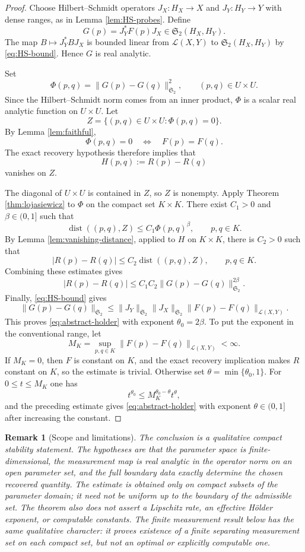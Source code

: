 \documentclass[12pt,oneside]{amsart}
\newtheorem{remark}[theorem]{Remark}
\newcommand{\cL}{\mathcal L}
\newcommand{\dist}{\operatorname{dist}}
\newcommand{\HS}{\mathfrak S_2}
\begin{document}
\begin{proof}
Choose Hilbert--Schmidt operators $J_X:H_X\to X$ and $J_Y:H_Y\to Y$ with dense ranges, as in Lemma \ref{lem:HS-probes}.  Define
\[
        G(p)=J_Y^*F(p)J_X\in\HS(H_X,H_Y).
\]
The map $B\mapsto J_Y^*BJ_X$ is bounded linear from $\cL(X,Y)$ to $\HS(H_X,H_Y)$ by \eqref{eq:HS-bound}.  Hence $G$ is real analytic.

Set
\[
        \Phi(p,q)=\|G(p)-G(q)\|_{\HS}^2,
        \qquad (p,q)\in U\times U .
\]
Since the Hilbert--Schmidt norm comes from an inner product, $\Phi$ is a scalar real analytic function on $U\times U$.  Let
\[
        Z=\{(p,q)\in U\times U:\Phi(p,q)=0\}.
\]
By Lemma \ref{lem:faithful},
\[
        \Phi(p,q)=0
        \quad\Longleftrightarrow\quad
        F(p)=F(q).
\]
The exact recovery hypothesis therefore implies that
\[
        H(p,q):=R(p)-R(q)
\]
vanishes on $Z$.

The diagonal of $U\times U$ is contained in $Z$, so $Z$ is nonempty.  Apply Theorem \ref{thm:lojasiewicz} to $\Phi$ on the compact set $K\times K$.  There exist $C_1>0$ and $\beta\in(0,1]$ such that
\[
        \dist((p,q),Z)
        \le C_1\Phi(p,q)^\beta,
        \qquad p,q\in K .
\]
By Lemma \ref{lem:vanishing-distance}, applied to $H$ on $K\times K$, there is $C_2>0$ such that
\[
        |R(p)-R(q)|
        \le C_2\dist((p,q),Z),
        \qquad p,q\in K .
\]
Combining these estimates gives
\[
        |R(p)-R(q)|
        \le C_1C_2\|G(p)-G(q)\|_{\HS}^{2\beta}.
\]
Finally, \eqref{eq:HS-bound} gives
\[
        \|G(p)-G(q)\|_{\HS}
        \le \|J_Y\|_{\HS}\|J_X\|_{\HS}
        \|F(p)-F(q)\|_{\cL(X,Y)} .
\]
This proves \eqref{eq:abstract-holder} with exponent $\theta_0=2\beta$.  To put the exponent in the conventional range, let
\[
        M_K=\sup_{p,q\in K}\|F(p)-F(q)\|_{\cL(X,Y)}<\infty .
\]
If $M_K=0$, then $F$ is constant on $K$, and the exact recovery implication makes $R$ constant on $K$, so the estimate is trivial.  Otherwise set $\theta=\min\{\theta_0,1\}$.  For $0\le t\le M_K$ one has
\[
        t^{\theta_0}\le M_K^{\theta_0-\theta}t^\theta,
\]
and the preceding estimate gives \eqref{eq:abstract-holder} with exponent $\theta\in(0,1]$ after increasing the constant.
\end{proof}

\begin{remark}[Scope and limitations]\label{rem:scope-limitations}
The conclusion is a qualitative compact stability statement.  The hypotheses are
that the parameter space is finite-dimensional, the measurement map is real
analytic in the operator norm on an open parameter set, and the full boundary
data exactly determine the chosen recovered quantity.  The estimate is obtained
only on compact subsets of the parameter domain; it need not be uniform up to the
boundary of the admissible set.  The theorem also does not assert a Lipschitz
rate, an effective H\"older exponent, or computable constants.  The finite
measurement result below has the same qualitative character: it proves existence
of a finite separating measurement set on each compact set, but not an optimal or
explicitly computable one.
\end{remark}
\end{document}
